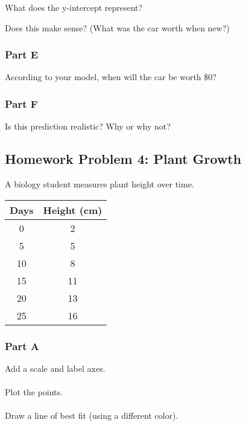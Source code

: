 \documentclass[12pt]{article}
\begin{document}
\begin{itemize}
				What does the y-intercept represent?

				\vspace{2cm}

				Does this make sense? (What was the car worth when new?)

				\vspace{2cm}

			\subsubsection*{Part E}
			
				According to your model, when will the car be worth \$0?

				\vspace{3cm}

			\subsubsection*{Part F}
			
				Is this prediction realistic? Why or why not?

				\vspace{3cm}

				\newpage

		\subsection*{Homework Problem 4: Plant Growth}

			A biology student measures plant height over time.

			\begin{center}
				\begin{tabular}{|c|c|}
					\hline
					Days & Height (cm) \\
					\hline
					0 & 2 \\
					5 & 5 \\
					10 & 8 \\
					15 & 11 \\
					20 & 13 \\
					25 & 16 \\
					\hline
				\end{tabular}
			\end{center}

			\subsubsection*{Part A}
			
				Add a scale and label axes.\\\\
				Plot the points.\\\\
				Draw a line of best fit (using a different color).


\end{itemize}
\end{document}
